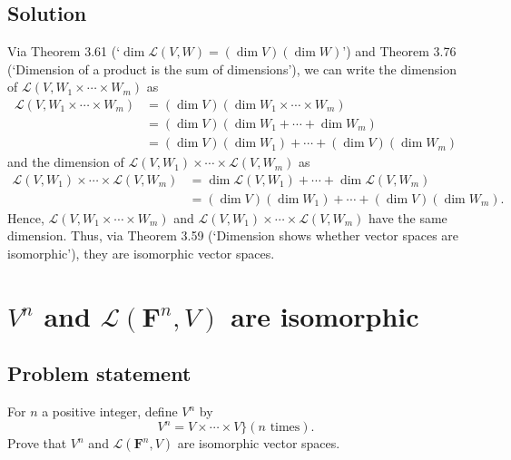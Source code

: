\documentclass{article}
\begin{document}
\subsection*{Solution}
Via Theorem 3.61 (`$\operatorname{dim}\mathcal{L}(V,W)=(\operatorname{dim}V)(\operatorname{dim}W)$') and Theorem 3.76 (`Dimension of a product is the sum of dimensions'), we can write the dimension of $\mathcal{L}(V,W_1\times\cdots\times W_m)$ as
\begin{align*}
    \mathcal{L}(V,W_1\times\cdots\times W_m)&=(\operatorname{dim}V)(\operatorname{dim}W_1\times\cdots\times W_m)\\
    &=(\operatorname{dim}V)(\operatorname{dim}W_1+\cdots+\operatorname{dim}W_m)\\
    &=(\operatorname{dim}V)(\operatorname{dim}W_1)+\cdots+(\operatorname{dim}V)(\operatorname{dim}W_m)
\end{align*}
and the dimension of $\mathcal{L}(V,W_1)\times\cdots\times\mathcal{L}(V,W_m)$ as
\begin{align*}
    \mathcal{L}(V,W_1)\times\cdots\times\mathcal{L}(V,W_m)&=\operatorname{dim}\mathcal{L}(V,W_1)+\cdots+\operatorname{dim}\mathcal{L}(V,W_m)\\
    &=(\operatorname{dim}V)(\operatorname{dim}W_1)+\cdots+(\operatorname{dim}V)(\operatorname{dim}W_m).
\end{align*}
Hence, $\mathcal{L}(V,W_1\times\cdots\times W_m)$ and $\mathcal{L}(V,W_1)\times\cdots\times\mathcal{L}(V,W_m)$ have the same dimension. 
Thus, via Theorem 3.59 (`Dimension shows whether vector spaces are isomorphic'), they are isomorphic vector spaces. 

\clearpage

\section{$V^n$ and $\mathcal{L}(\mathbf{F}^n,V)$ are isomorphic}
\subsection*{Problem statement}
For $n$ a positive integer, define $V^n$ by
\[V^n=V\times\cdots\times V\Big\}(n\text{ times}).\]
Prove that $V^n$ and $\mathcal{L}(\mathbf{F}^n,V)$ are isomorphic vector spaces.
\end{document}
